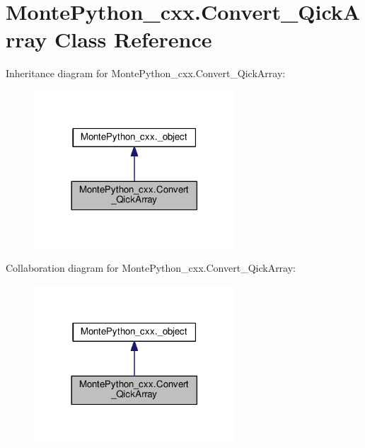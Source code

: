 \hypertarget{classMontePython__cxx_1_1Convert__QickArray}{}\section{Monte\+Python\+\_\+cxx.\+Convert\+\_\+\+Qick\+Array Class Reference}
\label{classMontePython__cxx_1_1Convert__QickArray}


Inheritance diagram for Monte\+Python\+\_\+cxx.\+Convert\+\_\+\+Qick\+Array\+:
\nopagebreak
\begin{figure}[H]
\begin{center}
\leavevmode
\includegraphics[width=213pt]{classMontePython__cxx_1_1Convert__QickArray__inherit__graph}
\end{center}
\end{figure}


Collaboration diagram for Monte\+Python\+\_\+cxx.\+Convert\+\_\+\+Qick\+Array\+:
\nopagebreak
\begin{figure}[H]
\begin{center}
\leavevmode
\includegraphics[width=213pt]{classMontePython__cxx_1_1Convert__QickArray__coll__graph}
\end{center}
\end{figure}
